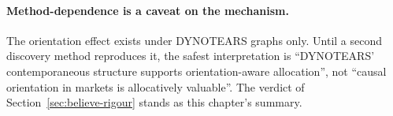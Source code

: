 \paragraph{Method-dependence is a caveat on the mechanism.} The orientation
effect exists under DYNOTEARS graphs only. Until a second discovery method
reproduces it, the safest interpretation is ``DYNOTEARS' contemporaneous
structure supports orientation-aware allocation'', not ``causal orientation
in markets is allocatively valuable''. The verdict of
Section~\ref{sec:believe-rigour} stands as this chapter's summary.
